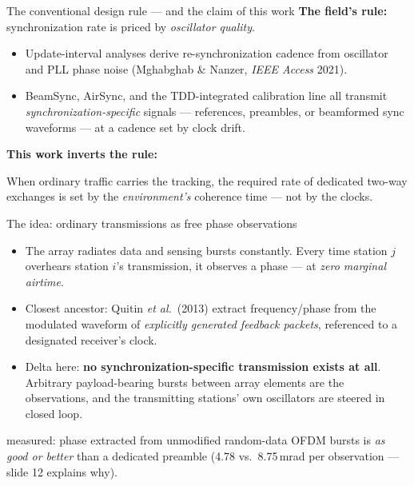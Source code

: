 \documentclass[aspectratio=169,10pt]{beamer}
\begin{document}
\begin{frame}{The conventional design rule --- and the claim of this work}
  \textbf{The field's rule:} synchronization rate is priced by
  \emph{oscillator quality}.
  \begin{itemize}
    \item Update-interval analyses derive re-synchronization cadence
          from oscillator and PLL phase noise (Mghabghab \& Nanzer,
          \emph{IEEE Access} 2021).
    \item BeamSync, AirSync, and the TDD-integrated calibration line
          all transmit \emph{synchronization-specific} signals ---
          references, preambles, or beamformed sync waveforms --- at a
          cadence set by clock drift.
  \end{itemize}
  \vspace{0.6em}
  \textbf{This work inverts the rule:}
  \begin{block}{}
    \centering
    When ordinary traffic carries the tracking, the required rate of
    dedicated two-way exchanges is set by the \emph{environment's}
    coherence time --- not by the clocks.
  \end{block}
\end{frame}

\begin{frame}{The idea: ordinary transmissions as free phase observations}
  \begin{itemize}
    \item The array radiates data and sensing bursts constantly.
          Every time station $j$ overhears station $i$'s transmission,
          it observes a phase --- at \emph{zero marginal airtime}.
    \item Closest ancestor: Quitin \emph{et al.}\ (2013) extract
          frequency/phase from the modulated waveform of
          \emph{explicitly generated feedback packets}, referenced to
          a designated receiver's clock.
    \item Delta here: \textbf{no synchronization-specific transmission
          exists at all}. Arbitrary payload-bearing bursts between
          array elements are the observations, and the transmitting
          stations' own oscillators are steered in closed loop.
  \end{itemize}
  \vspace{0.4em}
  \begin{center}
    \small measured: phase extracted from unmodified random-data OFDM
    bursts is \emph{as good or better} than a dedicated preamble
    (4.78 vs.\ 8.75\,mrad per observation --- slide 12 explains why).
  \end{center}
\end{frame}
\end{document}
